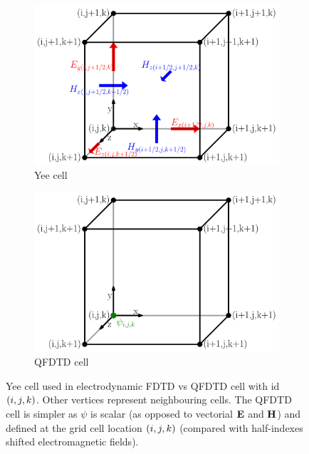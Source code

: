 \begin{figure}
 \centering
    \begin{subfigure}{0.48\columnwidth}
        \centering
        \includegraphics[width=\textwidth]{figures/fdtd_cell_yee}
        \caption{Yee cell}
        \label{fig:qfdtd:cell:yee}
    \end{subfigure}
    \begin{subfigure}{0.48\columnwidth}
        \centering
        \includegraphics[width=\textwidth]{figures/fdtd_cell_qfdtd}
        \caption{QFDTD cell}
        \label{fig:qfdtd:cell:qfdtd}
    \end{subfigure}
\caption{\label{fig:qfdtd:cell}Yee cell used in electrodynamic FDTD vs QFDTD
        cell with id $\left( i,j,k \right)$. Other vertices represent neighbouring cells.
        The QFDTD cell is simpler as $\psi$ is scalar (as opposed to vectorial
        $\textbf{E}$ and $\textbf{H}$) and defined at the grid cell location $\left( i,j,k \right)$
        (compared with half-indexes shifted electromagnetic fields).}
\end{figure}




